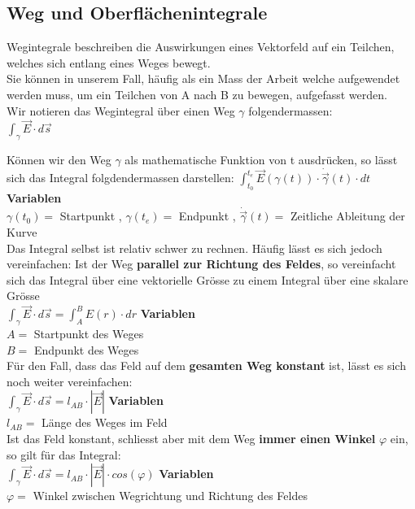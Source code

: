 \newpage
\subsection{Weg und Oberflächenintegrale}

\begingl
Wegintegrale beschreiben die Auswirkungen eines Vektorfeld auf ein Teilchen, welches sich entlang eines Weges bewegt. \\
Sie können in unserem Fall, häufig als ein Mass der Arbeit welche aufgewendet werden muss, um ein Teilchen von A nach B zu bewegen, aufgefasst werden. \\

Wir notieren das Wegintegral über einen Weg $\gamma$ folgendermassen: \\
\formulaBegin
$ \displaystyle \int_\gamma \vec{E} \cdot d\vec{s}$
\formulaEnd

Können wir den Weg $\gamma$ als mathematische Funktion von t ausdrücken, so lässt sich das Integral folgdendermassen darstellen:
\formulaBegin
$\displaystyle \int_{t_0}^{t_e} \vec{E}(\gamma(t)) \cdot \dot{\vec{\gamma}}(t) \cdot dt$
\formulaEnd
\textbf{Variablen} \\
$\gamma(t_0) = $ Startpunkt ,  $\gamma(t_e) = $ Endpunkt , $ \dot{\vec{\gamma}}(t) = $ Zeitliche Ableitung der Kurve \\


Das Integral selbst ist relativ schwer zu rechnen. Häufig lässt es sich jedoch vereinfachen:
Ist der Weg \textbf{parallel zur Richtung des Feldes}, so vereinfacht sich das Integral über eine vektorielle Grösse zu einem Integral über eine skalare Grösse \\
\formulaBegin
$\displaystyle \int_\gamma \vec{E} \cdot d\vec{s} = \int_A^B E(r) \cdot dr $
\formulaEnd
\textbf{Variablen} \\
$ A  = $ Startpunkt des Weges\\
$ B = $ Endpunkt des Weges \\

Für den Fall, dass das Feld auf dem \textbf{gesamten Weg konstant} ist, lässt es sich noch weiter vereinfachen: \\
\formulaBegin
$\displaystyle \int_\gamma \vec{E} \cdot d\vec{s} = l_{AB} \cdot |\vec{E}|$
\formulaEnd
\textbf{Variablen} \\
$ l_{AB}  = $ Länge des Weges im Feld\\
Ist das Feld konstant, schliesst aber mit dem Weg \textbf{immer einen Winkel} $\varphi$ ein, so gilt für das Integral: \\
\formulaBegin
$\displaystyle \int_\gamma \vec{E} \cdot d\vec{s} = l_{AB} \cdot |\vec{E}|\cdot cos(\varphi)$
\formulaEnd
\textbf{Variablen} \\
$ \varphi  = $  Winkel zwischen Wegrichtung und Richtung des Feldes\\

